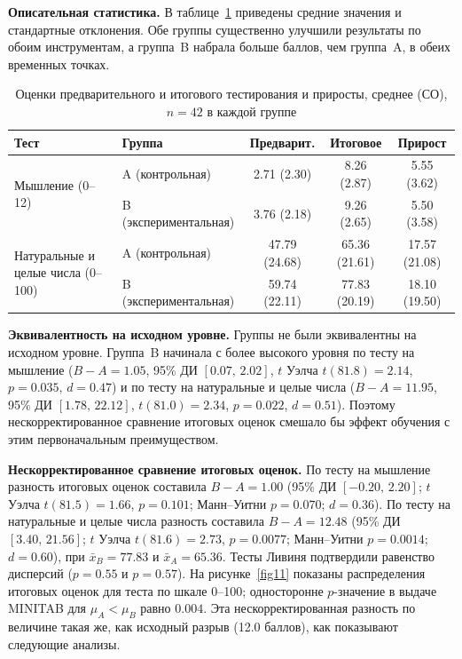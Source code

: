 \documentclass[a4paper,14pt]{extreport}
\theoremstyle{plain}
\theoremstyle{definition}
\theoremstyle{remark}
\begin{document}
\textbf{Описательная статистика.}
В таблице~\ref{tab:descriptive} приведены средние значения и стандартные отклонения. Обе группы существенно улучшили результаты по обоим инструментам, а группа~B набрала больше баллов, чем группа~A, в обеих временных точках.

\begin{table}[ht!]
	\centering
	\caption{Оценки предварительного и итогового тестирования и приросты, среднее (СО), $n=42$ в каждой группе}
	\label{tab:descriptive}
	\small
	\setlength{\tabcolsep}{2pt}
	\renewcommand{\arraystretch}{1.3}
	\begin{tabular}{|p{4.0cm}|l|c|c|c|}
		\hline
		\textbf{Тест} & \textbf{Группа} & \textbf{Предварит.} & \textbf{Итоговое} & \textbf{Прирост} \\ \hline
		\multirow{2}{4.0cm}{Мышление (0--12)} & A (контрольная) & 2.71 (2.30) & 8.26 (2.87) & 5.55 (3.62) \\ \cline{2-5}
		& B (экспериментальная) & 3.76 (2.18) & 9.26 (2.65) & 5.50 (3.58) \\ \hline
		\multirow{2}{4.0cm}{Натуральные и целые числа (0--100)} & A (контрольная) & 47.79 (24.68) & 65.36 (21.61) & 17.57 (21.08) \\ \cline{2-5}
		& B (экспериментальная) & 59.74 (22.11) & 77.83 (20.19) & 18.10 (19.50) \\ \hline
	\end{tabular}
\end{table}

\textbf{Эквивалентность на исходном уровне.}
Группы не были эквивалентны на исходном уровне. Группа~B начинала с более высокого уровня по тесту на мышление ($B-A=1.05$, 95\% ДИ $[0.07,\,2.02]$, $t$ Уэлча $t(81.8)=2.14$, $p=0.035$, $d=0.47$) и по тесту на натуральные и целые числа ($B-A=11.95$, 95\% ДИ $[1.78,\,22.12]$, $t(81.0)=2.34$, $p=0.022$, $d=0.51$). Поэтому нескорректированное сравнение итоговых оценок смешало бы эффект обучения с этим первоначальным преимуществом.

\textbf{Нескорректированное сравнение итоговых оценок.}
По тесту на мышление разность итоговых оценок составила $B-A=1.00$ (95\% ДИ $[-0.20,\,2.20]$; $t$ Уэлча $t(81.5)=1.66$, $p=0.101$; Манн--Уитни $p=0.070$; $d=0.36$). По тесту на натуральные и целые числа разность составила $B-A=12.48$ (95\% ДИ $[3.40,\,21.56]$; $t$ Уэлча $t(81.6)=2.73$, $p=0.0077$; Манн--Уитни $p=0.0014$; $d=0.60$), при $\bar{x}_B=77.83$ и $\bar{x}_A=65.36$. Тесты Ливиня подтвердили равенство дисперсий ($p=0.55$ и $p=0.57$). На рисунке~\ref{fig11} показаны распределения итоговых оценок для теста по шкале 0--100; односторонне $p$-значение в выдаче MINITAB для $\mu_A<\mu_B$ равно $0.004$. Эта нескорректированная разность по величине такая же, как исходный разрыв (12.0 баллов), как показывают следующие анализы.
\end{document}

